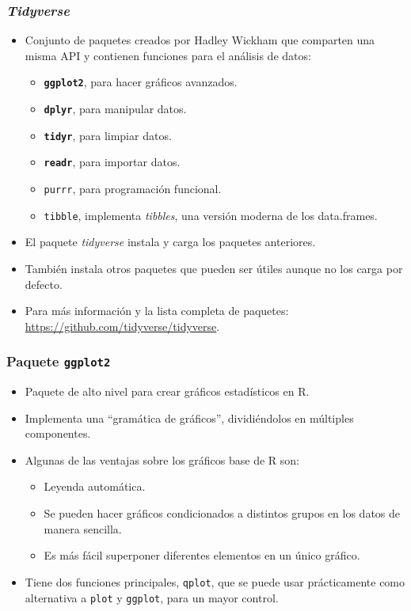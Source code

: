 \documentclass{beamer}
\begin{document}
\begin{frame}
\frametitle{\textit{Tidyverse}}

\begin{itemize}
\item Conjunto de paquetes creados por Hadley Wickham que comparten una misma API y contienen funciones para el análisis de datos:
\begin{itemize}
    \item \textbf{\texttt{ggplot2}}, para hacer gráficos avanzados.
    \item \textbf{\texttt{dplyr}}, para manipular datos.
    \item \textbf{\texttt{tidyr}}, para limpiar datos.
    \item \textbf{\texttt{readr}}, para importar datos.
    \item \texttt{purrr}, para programación funcional.
    \item \texttt{tibble}, implementa \textit{tibbles}, una versión moderna de los data.frames.
\end{itemize}

\item El paquete \textit{tidyverse} instala y carga los paquetes anteriores.

\item También instala otros paquetes que pueden ser útiles aunque no los carga por defecto.

\item Para más información y la lista completa de paquetes: \url{https://github.com/tidyverse/tidyverse}.
\end{itemize}
\end{frame}


\begin{frame}
\frametitle{Paquete \texttt{ggplot2}}

\begin{itemize}
\item Paquete de alto nivel para crear gráficos estadísticos en R.
\item Implementa una ``gramática de gráficos'', dividiéndolos en múltiples componentes.
\item Algunas de las ventajas sobre los gráficos base de R son:
\begin{itemize}
\item Leyenda automática.
\item Se pueden hacer gráficos condicionados a distintos grupos en los datos de manera sencilla.
\item Es más fácil superponer diferentes elementos en un único gráfico.
\end{itemize}
\item Tiene dos funciones principales, \texttt{qplot}, que se puede usar prácticamente como alternativa a \texttt{plot} y \texttt{ggplot}, para un mayor control.
\end{itemize}
\end{frame}
\end{document}
